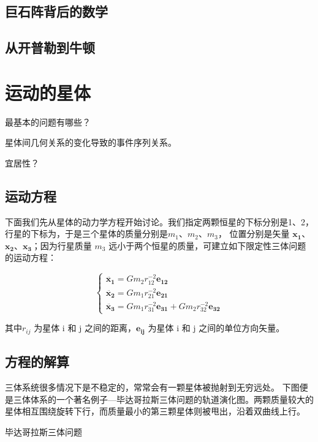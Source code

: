 \documentclass[a4paper,10.5pt]{book}
\begin{document}
\section{巨石阵背后的数学}


\section{从开普勒到牛顿}





\chapter{运动的星体}

最基本的问题有哪些？

星体间几何关系的变化导致的事件序列关系。

宜居性？

\section{运动方程}

下面我们先从星体的动力学方程开始讨论。我们指定两颗恒星的下标分别是1、2，行星的下标为，于是三个星体的质量分别是$m_1$、$m_2$、$m_3$，
位置分别是矢量 $\mathbf{x_1}$、$\mathbf{x_2}$、$\mathbf{x_3}$；因为行星质量 $m_3$ 远小于两个恒星的质量，可建立如下限定性三体问题的运动方程：

$$
\begin{cases}
\ddot{\mathbf{x_1}} = Gm_2r_{12}^{-2} \mathbf{e_{12}}\\
\ddot{\mathbf{x_2}} = Gm_1r_{21}^{-2} \mathbf{e_{21}}\\
\ddot{\mathbf{x_3}} = Gm_1r_{31}^{-2} \mathbf{e_{31}} + Gm_2r_{32}^{-2} \mathbf{e_{32}}
\end{cases}
$$

其中$r_{ij}$ 为星体 i 和 j 之间的距离，$\mathbf{e_{ij}}$ 为星体 i 和 j 之间的单位方向矢量。

\section{方程的解算}

三体系统很多情况下是不稳定的，常常会有一颗星体被抛射到无穷远处。
下图便是三体体系的一个著名例子—毕达哥拉斯三体问题的轨道演化图。两颗质量较大的星体相互围绕旋转下行，而质量最小的第三颗星体则被甩出，沿着双曲线上行。

毕达哥拉斯三体问题
\end{document}
